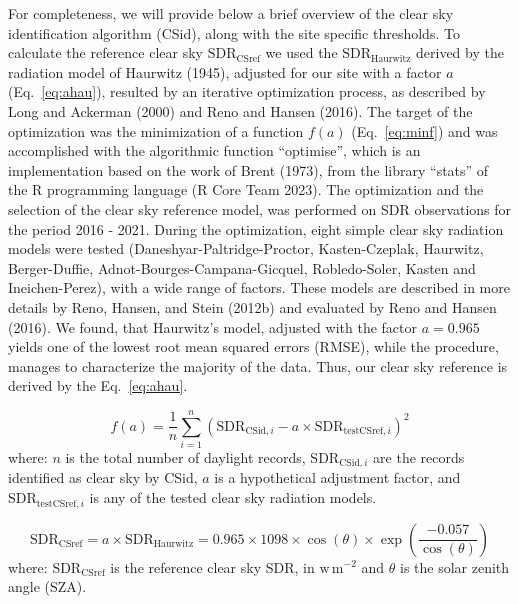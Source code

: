 \documentclass[
]{article}
\begin{document}
For completeness, we will provide below a brief overview of the
clear sky identification algorithm (CSid),
along with the site specific thresholds.
To calculate the reference clear sky
\(\text{SDR}_\text{CSref}\) we used the \(\text{SDR}_\text{Haurwitz}\) derived by
the radiation model of Haurwitz (1945), adjusted for our site with a
factor \(a\) (Eq.~\ref{eq:ahau}), resulted by an iterative optimization process, as described
by Long and Ackerman (2000) and Reno and Hansen (2016).
The target of
the optimization was the minimization of a function \(f(a)\) (Eq.~\ref{eq:minf}) and
was accomplished with the algorithmic function ``optimise'', which is an implementation based on the work of Brent (1973), from the library ``stats'' of the R programming language (R Core Team 2023).
The optimization and the selection of the clear sky reference model, was performed on SDR observations for the period 2016 - 2021.
During the optimization, eight simple clear sky radiation models were tested (Daneshyar-Paltridge-Proctor, Kasten-Czeplak, Haurwitz, Berger-Duffie, Adnot-Bourges-Campana-Gicquel, Robledo-Soler, Kasten and Ineichen-Perez), with a wide range of factors.
These models are described in more details by Reno, Hansen, and Stein (2012b) and evaluated by Reno and Hansen (2016).
We found, that Haurwitz's model, adjusted with the factor \(a = 0.965\) yields one of the lowest root mean squared errors (RMSE),
while the procedure, manages to characterize the majority of the data.
Thus, our clear sky reference is derived by the Eq.~\ref{eq:ahau}.

\begin{equation}
f(a) = \frac{1}{n}\sum_{i=1}^{n} ( \text{SDR}_{\text{CSid},i} - a \times \text{SDR}_{\text{testCSref},i} )^2 \label{eq:minf}
\end{equation}
where: \(n\) is the total number of daylight records, \(\text{SDR}_{\text{CSid},i}\) are the records identified as clear sky by CSid, \(a\) is a hypothetical adjustment factor, and \(\text{SDR}_{\text{testCSref},i}\) is any of the tested clear sky radiation models.

\begin{equation}
\text{SDR}_\text{CSref} = a \times \text{SDR}_\text{Haurwitz} = 0.965 \times 1098 \times \cos(\theta) \times \exp \left( \frac{ - 0.057}{\cos(\theta)} \right) \label{eq:ahau}
\end{equation}
where: \(\text{SDR}_\text{CSref}\) is the reference clear sky SDR, in \(\text{w}\,\text{m}^{-2}\) and \(\theta\) is the solar zenith angle (SZA).
\end{document}
